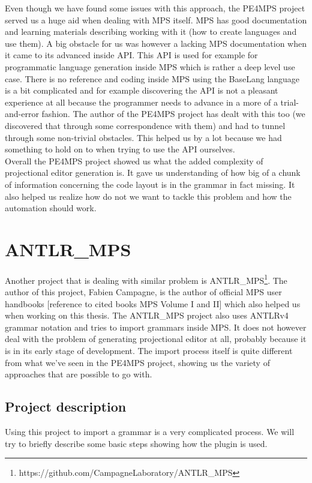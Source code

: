Even though we have found some issues with this approach, the PE4MPS project served us a huge aid when dealing with MPS itself. MPS has good documentation and learning materials describing working with it (how to create languages and use them). A big obstacle for us was however a lacking MPS documentation when it came to its advanced inside API. This API is used for example for programmatic language generation inside MPS which is rather a deep level use case. There is no reference and coding inside MPS using the BaseLang language is a bit complicated and for example discovering the API is not a pleasant experience at all because the programmer needs to advance in a more of a trial-and-error fashion. The author of the PE4MPS project has dealt with this too (we discovered that through some correspondence with them) and had to tunnel through some non-trivial obstacles. This helped us by a lot because we had something to hold on to when trying to use the API ourselves.
\\

Overall the PE4MPS project showed us what the added complexity of projectional editor generation is. It gave us understanding of how big of a chunk of information concerning the code layout is in the grammar in fact missing. It also helped us realize how do not we want to tackle this problem and how the automation should work.

\section{ANTLR{\_}MPS}
Another project that is dealing with similar problem is ANTLR{\_}MPS\footnote{https://github.com/CampagneLaboratory/ANTLR{\_}MPS}. The author of this project, Fabien Campagne, is the author of official MPS user handbooks [reference to cited books MPS Volume I and II] which also helped us when working on this thesis. The ANTLR{\_}MPS project also uses ANTLRv4 grammar notation and tries to import grammars inside MPS. It does not however deal with the problem of generating projectional editor at all, probably because it is in its early stage of development. The import process itself is quite different from what we've seen in the PE4MPS project, showing us the variety of approaches that are possible to go with.

\subsection{Project description}
Using this project to import a grammar is a very complicated process. We will try to briefly describe some basic steps showing how the plugin is used. 
\\

